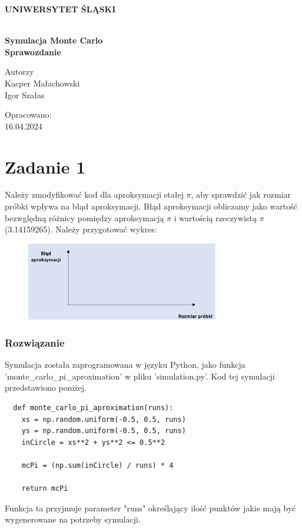 \documentclass[12pt,oneside,a4paper]{book} %
\theoremstyle{break}
\begin{document}
\thispagestyle{empty}
\begin{center}
  \Large
  \bf{UNIWERSYTET ŚLĄSKI}\\
  \bf{}\\[25mm]
  \large

  \bf{Symulacja Monte Carlo}\\[35mm]

  Sprawozdanie\\[25mm]
\end{center}
\begin{flushright}
  \large
  Autorzy\\
  Kacper Małachowski\\
  Igor Szałas\\[25mm]
\end{flushright}
\begin{center}
  Opracowano:\\
  16.04.2024
\end{center}

\chapter*{Zadanie 1}

Należy zmodyfikować kod dla aproksymacji stałej $\pi$, aby sprawdzić jak rozmiar próbki wpływa na błąd aproksymacji. Błąd aproksymacji obliczamy jako wartość bezwględną różnicy pomiędzy aproksymacją $\pi$ i wartością rzeczywistą $\pi$ (3.14159265). Należy przygotować wykres:

\begin{figure}[H]
  \centering
  \includegraphics[width=0.75\textwidth]{chart_from_instruction.png}
\end{figure}

\subsection*{Rozwiązanie}

Symulacja została zaprogramowana w języku Python, jako funkcja\\ 'monte\_carlo\_pi\_aproximation' w pliku 'simulation.py'.
Kod tej symulacji przedstawiono poniżej.
\begin{verbatim}
  def monte_carlo_pi_aproximation(runs):
    xs = np.random.uniform(-0.5, 0.5, runs)
    ys = np.random.uniform(-0.5, 0.5, runs)
    inCircle = xs**2 + ys**2 <= 0.5**2

    mcPi = (np.sum(inCircle) / runs) * 4

    return mcPi
\end{verbatim}
Funkcja ta przyjmuje parameter "runs" określający ilość punktów jakie mają być wygenerowane na potrzeby symulacji.
\end{document}
